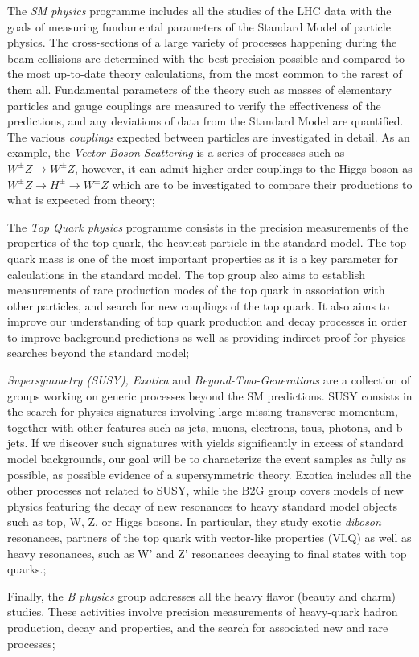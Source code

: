 \begin{outline}
    \1 The \emph{SM physics} programme includes all the studies of the LHC data with the goals of measuring fundamental parameters of the Standard Model of particle physics. The cross-sections of a large variety of processes happening during the beam collisions are determined with the best precision possible and compared to the most up-to-date theory calculations, from the most common to the rarest of them all. Fundamental parameters of the theory such as masses of elementary particles and gauge couplings are measured to verify the effectiveness of the predictions, and any deviations of data from the Standard Model are quantified. The various \emph{couplings} expected between particles are investigated in detail. As an example, the \emph{Vector Boson Scattering} is a series of processes such as $W^{\pm} Z \rightarrow W^{\pm} Z$, however, it can admit higher-order couplings to the Higgs boson as $W^{\pm} Z \rightarrow H^{\pm} \rightarrow W^{\pm} Z$ which are to be investigated to compare their productions to what is expected from theory;
    
    \1 The \emph{Top Quark physics} programme consists in the precision measurements of the properties of the top quark, the heaviest particle in the standard model. The top-quark mass is one of the most important properties as it is a key parameter for calculations in the standard model. The top group also aims to establish measurements of rare production modes of the top quark in association with other particles, and search for new couplings of the top quark. It also aims to improve our understanding of top quark production and decay processes in order to improve background predictions as well as providing indirect proof for physics searches beyond the standard model;
    
    \1 \emph{Supersymmetry (SUSY), Exotica} and \emph{Beyond-Two-Generations} are a collection of groups working on generic processes beyond the SM predictions. SUSY consists in the search for physics signatures involving large missing transverse momentum, together with other features such as jets, muons, electrons, taus, photons, and b-jets. If we discover such signatures with yields significantly in excess of standard model backgrounds, our goal will be to characterize the event samples as fully as possible, as possible evidence of a supersymmetric theory. Exotica includes all the other processes not related to SUSY, while the B2G group covers models of new physics featuring the decay of new resonances to heavy standard model objects such as top, W, Z, or Higgs bosons. In particular, they study exotic \emph{diboson} resonances, partners of the top quark with vector-like properties (VLQ) as well as heavy resonances, such as W' and Z' resonances decaying to final states with top quarks.;
    
    \1 Finally, the \emph{B physics} group addresses all the heavy flavor (beauty and charm) studies. These activities involve precision measurements of heavy-quark hadron production, decay and properties, and the search for associated new and rare processes;
    
\end{outline}

